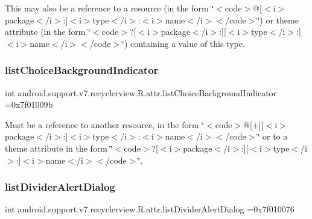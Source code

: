 This may also be a reference to a resource (in the form \char`\"{}$<$code$>$@\mbox{[}$<$i$>$package$<$/i$>$\+:\mbox{]}$<$i$>$type$<$/i$>$\+:$<$i$>$name$<$/i$>$$<$/code$>$\char`\"{}) or theme attribute (in the form \char`\"{}$<$code$>$?\mbox{[}$<$i$>$package$<$/i$>$\+:\mbox{]}\mbox{[}$<$i$>$type$<$/i$>$\+:\mbox{]}$<$i$>$name$<$/i$>$$<$/code$>$\char`\"{}) containing a value of this type. \mbox{\label{classandroid_1_1support_1_1v7_1_1recyclerview_1_1R_1_1attr_acf0b97792e32abd922cc12ee7fd21933}} 
\subsubsection{\texorpdfstring{list\+Choice\+Background\+Indicator}{listChoiceBackgroundIndicator}}
{\footnotesize\ttfamily int android.\+support.\+v7.\+recyclerview.\+R.\+attr.\+list\+Choice\+Background\+Indicator =0x7f01009b\hspace{0.3cm}{\ttfamily [static]}}

Must be a reference to another resource, in the form \char`\"{}$<$code$>$@\mbox{[}+\mbox{]}\mbox{[}$<$i$>$package$<$/i$>$\+:\mbox{]}$<$i$>$type$<$/i$>$\+:$<$i$>$name$<$/i$>$$<$/code$>$\char`\"{} or to a theme attribute in the form \char`\"{}$<$code$>$?\mbox{[}$<$i$>$package$<$/i$>$\+:\mbox{]}\mbox{[}$<$i$>$type$<$/i$>$\+:\mbox{]}$<$i$>$name$<$/i$>$$<$/code$>$\char`\"{}. \mbox{\label{classandroid_1_1support_1_1v7_1_1recyclerview_1_1R_1_1attr_aa1c6e2f7ad33af1aa30ef5212aaf99e0}} 
\subsubsection{\texorpdfstring{list\+Divider\+Alert\+Dialog}{listDividerAlertDialog}}
{\footnotesize\ttfamily int android.\+support.\+v7.\+recyclerview.\+R.\+attr.\+list\+Divider\+Alert\+Dialog =0x7f010076\hspace{0.3cm}{\ttfamily [static]}}

